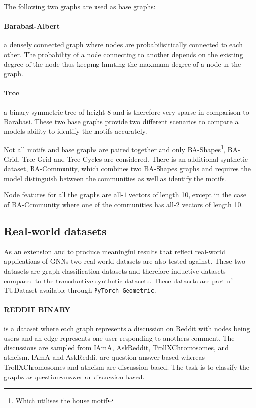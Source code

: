 The following two graphs are used as base graphs:

\paragraph{Barabasi-Albert}
a densely connected graph where nodes are probabilisitically connected to each other.
The probability of a node connecting to another depends on the existing degree of the node thus keeping limiting the maximum degree of a node in the graph.

\paragraph{Tree}
a binary symmetric tree of height 8 and is therefore very sparse in comparison to Barabasi.
These two base graphs provide two different scenarios to compare a models ability to identify the motifs accurately.

Not all motifs and base graphs are paired together and only BA-Shapes\footnote{Which utilises the house motif}, BA-Grid, Tree-Grid and Tree-Cycles are considered.
There is an additional synthetic dataset, BA-Community, which combines two BA-Shapes graphs and requires the model distinguish between the communities as well as identify the motifs.

Node features for all the graphs are all-$1$ vectors of length 10, except in the case of BA-Community where one of the communities has all-$2$ vectors of length 10.

\subsection{Real-world datasets}


As an extension and to produce meaningful results that reflect real-world applications of GNNs two real world datasets are also tested against.
These two datasets are graph classification datasets and therefore inductive datasets compared to the transductive synthetic datasets.
These datasets are part of TUDataset \cite{Morris+2020} available through \texttt{PyTorch Geometric}.

\paragraph{REDDIT BINARY}
is a dataset where each graph represents a discussion on Reddit with nodes being users and an edge represents one user responding to anothers comment.
The discussions are sampled from IAmA, AskReddit, TrollXChromosomes, and atheism.
IAmA and AskReddit are question-answer based whereas TrollXChromosomes and atheism are discussion based.
The task is to classify the graphs as question-answer or discussion based.

